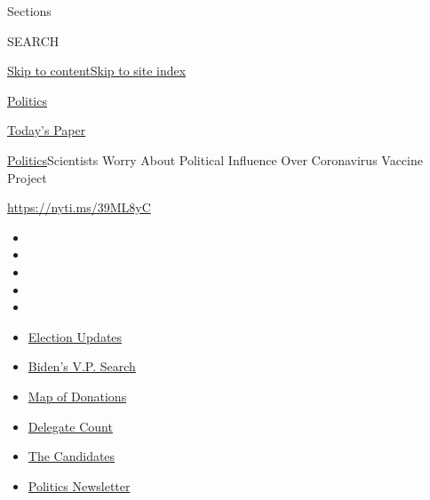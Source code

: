 Sections

SEARCH

\protect\hyperlink{site-content}{Skip to
content}\protect\hyperlink{site-index}{Skip to site index}

\href{https://www.nytimes.com/section/politics}{Politics}

\href{https://myaccount.nytimes.com/auth/login?response_type=cookie\&client_id=vi}{}

\href{https://www.nytimes.com/section/todayspaper}{Today's Paper}

\href{/section/politics}{Politics}\textbar{}Scientists Worry About
Political Influence Over Coronavirus Vaccine Project

\url{https://nyti.ms/39ML8yC}

\begin{itemize}
\item
\item
\item
\item
\item
\end{itemize}

\begin{itemize}
\item
  \href{https://www.nytimes.com/2020/07/31/us/elections/biden-vs-trump.html?action=click\&pgtype=Article\&state=default\&region=TOP_BANNER\&context=storylines_menu}{Election
  Updates}
\item
  \href{https://www.nytimes.com/article/biden-vice-president-2020.html?action=click\&pgtype=Article\&state=default\&region=TOP_BANNER\&context=storylines_menu}{Biden's
  V.P. Search}
\item
  \href{https://www.nytimes.com/interactive/2020/07/24/us/politics/trump-biden-campaign-donors.html?action=click\&pgtype=Article\&state=default\&region=TOP_BANNER\&context=storylines_menu}{Map
  of Donations}
\item
  \href{https://www.nytimes.com/interactive/2020/us/elections/delegate-count-primary-results.html?action=click\&pgtype=Article\&state=default\&region=TOP_BANNER\&context=storylines_menu}{Delegate
  Count}
\item
  \href{https://www.nytimes.com/interactive/2019/us/politics/2020-presidential-candidates.html?action=click\&pgtype=Article\&state=default\&region=TOP_BANNER\&context=storylines_menu}{The
  Candidates}
\item
  \href{https://www.nytimes.com/newsletters/politics?action=click\&pgtype=Article\&state=default\&region=TOP_BANNER\&context=storylines_menu}{Politics
  Newsletter}
\end{itemize}

